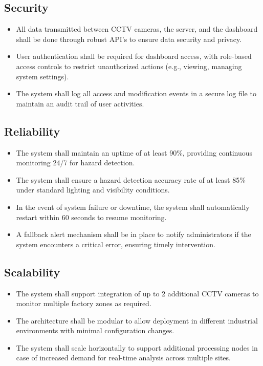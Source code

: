 \documentclass[12pt]{article}
\begin{document}
\subsection*{Security}
\begin{itemize}
    \item All data transmitted between CCTV cameras, the server, and the dashboard shall be done through robust API's to ensure data security and privacy.
    \item User authentication shall be required for dashboard access, with role-based access controls to restrict unauthorized actions (e.g., viewing, managing system settings).
    \item The system shall log all access and modification events in a secure log file to maintain an audit trail of user activities.
\end{itemize}

\subsection*{Reliability}
\begin{itemize}
    \item The system shall maintain an uptime of at least 90\%, providing continuous monitoring 24/7 for hazard detection.
    \item The system shall ensure a hazard detection accuracy rate of at least 85\% under standard lighting and visibility conditions.
    \item In the event of system failure or downtime, the system shall automatically restart within 60 seconds to resume monitoring.
    \item A fallback alert mechanism shall be in place to notify administrators if the system encounters a critical error, ensuring timely intervention.
\end{itemize}

\subsection*{Scalability}
\begin{itemize}
    \item The system shall support integration of up to 2 additional CCTV cameras to monitor multiple factory zones as required.
    \item The architecture shall be modular to allow deployment in different industrial environments with minimal configuration changes.
    \item The system shall scale horizontally to support additional processing nodes in case of increased demand for real-time analysis across multiple sites.
\end{itemize}
\end{document}
